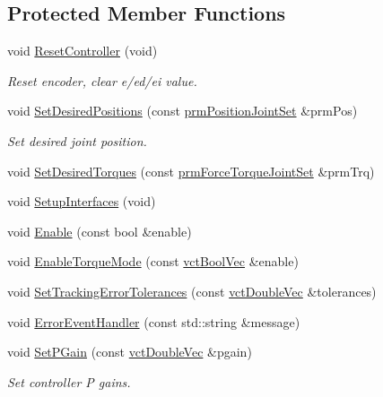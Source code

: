\subsection*{Protected Member Functions}
\begin{DoxyCompactItemize}
\item 
void \hyperlink{classmts_p_i_d_a3030a3b45b3705758cd6eb48d9983167}{Reset\-Controller} (void)
\begin{DoxyCompactList}\small\item\em Reset encoder, clear e/ed/ei value. \end{DoxyCompactList}\item 
void \hyperlink{classmts_p_i_d_a1fd56ab7aabfbf9e3d5a37bf3cda48b9}{Set\-Desired\-Positions} (const \hyperlink{classprm_position_joint_set}{prm\-Position\-Joint\-Set} \&prm\-Pos)
\begin{DoxyCompactList}\small\item\em Set desired joint position. \end{DoxyCompactList}\item 
void \hyperlink{classmts_p_i_d_a760420b20627be81350ef7cd096efe70}{Set\-Desired\-Torques} (const \hyperlink{classprm_force_torque_joint_set}{prm\-Force\-Torque\-Joint\-Set} \&prm\-Trq)
\item 
void \hyperlink{classmts_p_i_d_a8d6efcccfaa3a7a27dcb0a319c02723d}{Setup\-Interfaces} (void)
\item 
void \hyperlink{classmts_p_i_d_a0f04c1c727087cc07110a1d45c4e8d08}{Enable} (const bool \&enable)
\item 
void \hyperlink{classmts_p_i_d_a075d4b5fa191ff9a50b5bd0b54155428}{Enable\-Torque\-Mode} (const \hyperlink{vct_dynamic_vector_types_8h_aeb2237c134aee3769198bd9d55c8a9e0}{vct\-Bool\-Vec} \&enable)
\item 
void \hyperlink{classmts_p_i_d_a492f7d1e52d94f8b42ddf727482f489c}{Set\-Tracking\-Error\-Tolerances} (const \hyperlink{vct_dynamic_vector_types_8h_ade4b3068c86fb88f41af2e5187e491c2}{vct\-Double\-Vec} \&tolerances)
\item 
void \hyperlink{classmts_p_i_d_ae640419e82259f4f794d38a8cfe056b9}{Error\-Event\-Handler} (const std\-::string \&message)
\item 
void \hyperlink{classmts_p_i_d_a31ffe826ec92dd565bc33f797567e371}{Set\-P\-Gain} (const \hyperlink{vct_dynamic_vector_types_8h_ade4b3068c86fb88f41af2e5187e491c2}{vct\-Double\-Vec} \&pgain)
\begin{DoxyCompactList}\small\item\em Set controller P gains. \end{DoxyCompactList}\item 

\end{DoxyCompactItemize}
